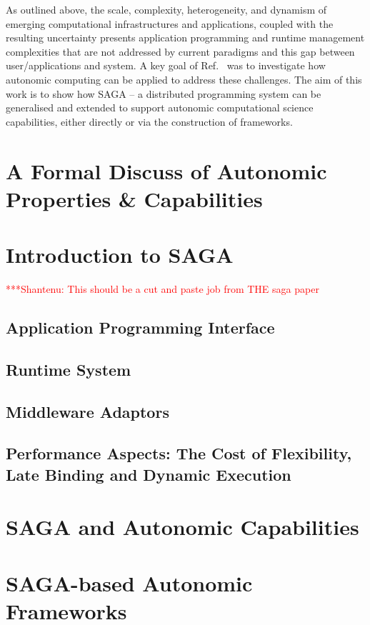 \documentclass[a4paper,10pt]{article}
\newcommand{\jhanote}[1]{  {\textcolor{red}     { ***Shantenu: #1 }}}
\newcommand{\jhanote}[1]{}
\begin{document}
As outlined above, the scale, complexity, heterogeneity, and dynamism
of emerging computational infrastructures and applications, coupled
with the resulting uncertainty presents application programming and
runtime management complexities that are not addressed by current
paradigms and this gap between user/applications and system.  A key
goal of Ref.~\cite{SOM-CISE10} was to investigate how autonomic
computing can be applied to address these challenges.  The aim of this
work is to show how SAGA -- a distributed programming system can be
generalised and extended to support autonomic computational science
capabilities, either directly or via the construction of frameworks.

\section{A Formal Discuss of Autonomic Properties \& Capabilities}

\section{Introduction to SAGA}

\jhanote{This should be a cut and paste job from THE saga paper}

\subsection{Application Programming Interface}

\subsection{Runtime System}

\subsection{Middleware Adaptors}

\subsection{Performance Aspects: The Cost of Flexibility, Late Binding
  and Dynamic Execution}

\section{SAGA and Autonomic Capabilities}


\section{SAGA-based Autonomic Frameworks}
\end{document}
